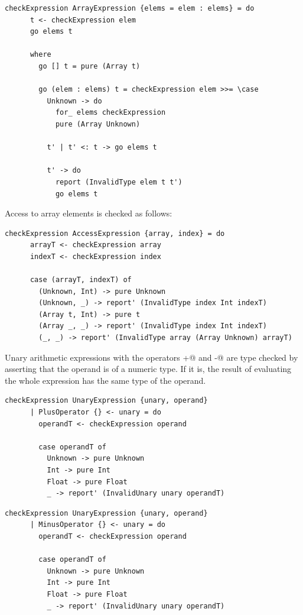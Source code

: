 \documentclass[UdineBachThesis,american,11pt,draft]{PhdThesis}
\begin{document}
  \begin{lstlisting}[gobble=4,basicstyle=\ttfamily\small]
    checkExpression ArrayExpression {elems = elem : elems} = do
      t <- checkExpression elem
      go elems t

      where
        go [] t = pure (Array t)

        go (elem : elems) t = checkExpression elem >>= \case
          Unknown -> do
            for_ elems checkExpression
            pure (Array Unknown)

          t' | t' <: t -> go elems t

          t' -> do
            report (InvalidType elem t t')
            go elems t
  \end{lstlisting}

  Access to array elements is checked as follows:

  \begin{lstlisting}[gobble=4,basicstyle=\ttfamily\small]
    checkExpression AccessExpression {array, index} = do
      arrayT <- checkExpression array
      indexT <- checkExpression index

      case (arrayT, indexT) of
        (Unknown, Int) -> pure Unknown
        (Unknown, _) -> report' (InvalidType index Int indexT)
        (Array t, Int) -> pure t
        (Array _, _) -> report' (InvalidType index Int indexT)
        (_, _) -> report' (InvalidType array (Array Unknown) arrayT)
  \end{lstlisting}

  Unary arithmetic expressions with the operators \lstinline@+@ and
  \lstinline@-@ are type checked by asserting that the operand is of a numeric
  type. If it is, the result of evaluating the whole expression has the same
  type of the operand.

  \begin{lstlisting}[gobble=4,basicstyle=\ttfamily\small]
    checkExpression UnaryExpression {unary, operand}
      | PlusOperator {} <- unary = do
        operandT <- checkExpression operand

        case operandT of
          Unknown -> pure Unknown
          Int -> pure Int
          Float -> pure Float
          _ -> report' (InvalidUnary unary operandT)
  \end{lstlisting}

  \begin{lstlisting}[gobble=4,basicstyle=\ttfamily\small]
    checkExpression UnaryExpression {unary, operand}
      | MinusOperator {} <- unary = do
        operandT <- checkExpression operand

        case operandT of
          Unknown -> pure Unknown
          Int -> pure Int
          Float -> pure Float
          _ -> report' (InvalidUnary unary operandT)
  \end{lstlisting}
\end{document}
